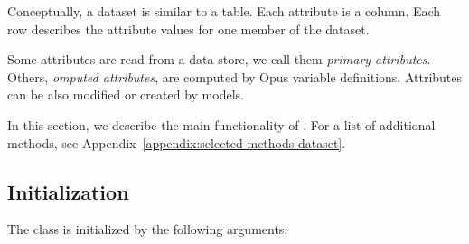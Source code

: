Conceptually, a dataset is similar to a table.  Each attribute is a column.
Each row describes the attribute values for one member of the dataset.

Some attributes are read from a data store, we call them 
\emph{primary attributes}.
Others, \emph{omputed attributes},
are computed by Opus variable definitions.  Attributes can be also modified or created by models.

In this section, we describe the main functionality of . For a list of additional methods, 
see Appendix~\ref{appendix:selected-methods-dataset}.

%
\subsection{Initialization}
%
The  class is initialized by the following arguments:
